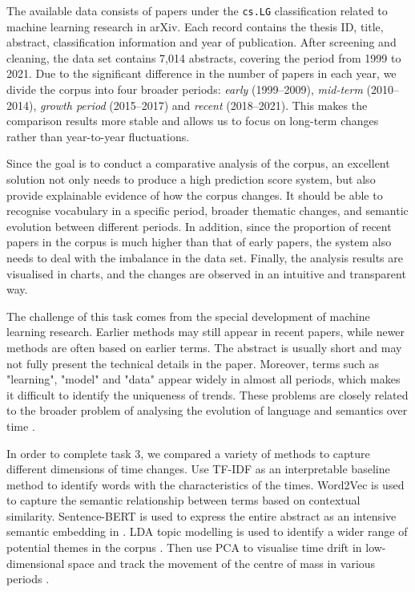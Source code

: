 \documentclass[11pt]{article}
\begin{document}
The available data consists of papers under the \texttt{cs.LG} classification related to machine learning research in arXiv. Each record contains the thesis ID, title, abstract, classification information and year of publication. After screening and cleaning, the data set contains 7,014 abstracts, covering the period from 1999 to 2021. Due to the significant difference in the number of papers in each year, we divide the corpus into four broader periods: \textit{early} (1999–2009), \textit{mid-term} (2010–2014), \textit{growth period} (2015–2017) and \textit{recent} (2018–2021). This makes the comparison results more stable and allows us to focus on long-term changes rather than year-to-year fluctuations.

Since the goal is to conduct a comparative analysis of the corpus, an excellent solution not only needs to produce a high prediction score system, but also provide explainable evidence of how the corpus changes. It should be able to recognise vocabulary in a specific period, broader thematic changes, and semantic evolution between different periods. In addition, since the proportion of recent papers in the corpus is much higher than that of early papers, the system also needs to deal with the imbalance in the data set. Finally, the analysis results are visualised in charts, and the changes are observed in an intuitive and transparent way.

The challenge of this task comes from the special development of machine learning research. Earlier methods may still appear in recent papers, while newer methods are often based on earlier terms. The abstract is usually short and may not fully present the technical details in the paper. Moreover, terms such as "learning", "model" and "data" appear widely in almost all periods, which makes it difficult to identify the uniqueness of trends. These problems are closely related to the broader problem of analysing the evolution of language and semantics over time \cite{frermann2016,tang2018}.

In order to complete task 3, we compared a variety of methods to capture different dimensions of time changes. Use TF-IDF as an interpretable baseline method to identify words with the characteristics of the times. Word2Vec is used to capture the semantic relationship between terms \cite{mikolov2013efficient,mikolov2013distributed} based on contextual similarity. Sentence-BERT is used to express the entire abstract as an intensive semantic embedding in \cite{reimers2019}. LDA topic modelling is used to identify a wider range of potential themes in the corpus \cite{blei2012}. Then use PCA to visualise time drift in low-dimensional space and track the movement of the centre of mass in various periods \cite{jolliffe2016}.
\end{document}
